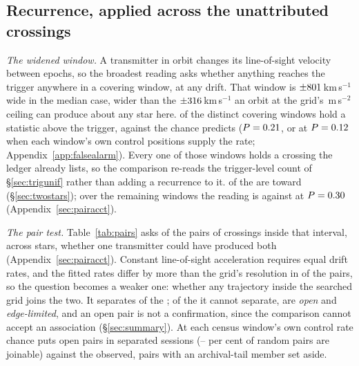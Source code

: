\subsection{Recurrence, applied across the unattributed crossings}
\label{sec:etacrv}

\emph{The widened window.} A transmitter in orbit changes its line-of-sight
velocity between epochs, so the broadest reading asks whether anything reaches
the trigger anywhere in a covering window, at any drift. That window is $\pm801$\,km\,s$^{-1}$ wide in the median
case, wider than the $\pm316$\,km\,s$^{-1}$ an orbit at the grid's
\WdAGrid\,m\,s$^{-2}$ ceiling can produce about any star here. \WuNWinExc{}
of the \WuNWin{} distinct covering windows hold a statistic above the
trigger, against the \WuExpWin{} chance predicts ($P=0.21$, or
\WuExpWinCtrl{} at $P=0.12$ when each window's own control positions
supply the rate; Appendix~\ref{app:falsealarm}). Every one of those windows
holds a crossing the ledger already lists, so the comparison re-reads the
trigger-level count of \S\ref{sec:trigunif} rather than adding a recurrence to it. \WuNWinExcTwo{} of the \WuNWinExc{} are
toward \WuTwoStars{}
(\S\ref{sec:twostars}); over the remaining \WuNWinRest{} windows the reading
is \WuNWinRestExc{} against \WuExpRest{} at $P=0.30$
(Appendix~\ref{sec:pairacct}).

\emph{The pair test.} Table~\ref{tab:pairs} asks of the \TjNPair{} pairs of
crossings inside that interval, across \TjNStarPair{} stars, whether one
transmitter could have produced both (Appendix~\ref{sec:pairacct}). Constant
line-of-sight acceleration requires equal drift rates, and the fitted rates
differ by more than the grid's resolution in \TjNUneqDrift{} of the
\TjNPair{} pairs, so the question becomes a weaker one: whether any trajectory inside the searched grid
joins the two. It separates
\TjNExcl{} of the \TjNPair{}; of the \TjNOpen{} it cannot separate, \TjNOpenPlain{}
are \emph{open} and \TjNPairEdge{} \emph{edge-limited}, and an open pair is not a
confirmation, since the comparison cannot accept an association
(\S\ref{sec:summary}). At each census window's own control rate chance puts
\OpExpSepRange{} open pairs in separated sessions
(\OpJoinPctLo--\OpJoinPctHi{} per cent of random pairs are joinable) against
the \OpObsSep{} observed, pairs with an archival-tail member set aside.

